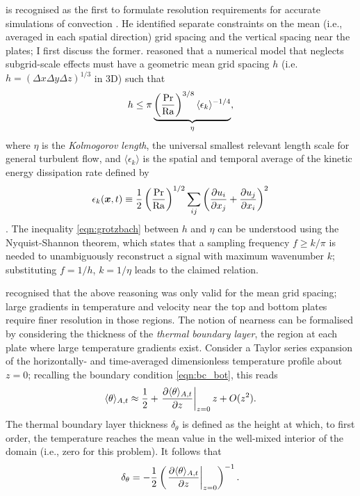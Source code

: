 \documentclass[../main.tex]{subfiles}
\begin{document}
\textcite{grotzbach1983} is recognised as the first to formulate resolution
requirements for accurate simulations of \rb{} convection
\parencite{chilla2012,scheel2013}. He identified separate constraints on the
mean (i.e., averaged in each spatial direction) grid spacing and the vertical
spacing near the plates; I first discuss the former. \citeauthor{grotzbach1983}
reasoned that a numerical model that neglects subgrid-scale effects must have a
geometric mean grid spacing $h$ (i.e. $h = (\Delta x \Delta y \Delta z)^{1/3}$
in 3D) such that
\begin{equation}
    \label{eqn:grotzbach}
    h \leq \pi \underbrace{
        \left( \frac{\mathrm{Pr}}{\mathrm{Ra}} \right)^{3/8}
        \langle \epsilon_k \rangle^{-1/4}
    }_{\eta},
\end{equation}
where $\eta$ is the \emph{Kolmogorov length}, the universal smallest relevant
length scale for general turbulent flow, and $\langle \epsilon_k \rangle$ is
the spatial and temporal average of the kinetic energy dissipation rate defined
by
\begin{equation}
    \label{eqn:kinetic_dissipation}
    \epsilon_k(\bm{x}, t) \equiv
        \frac{1}{2} \left( \frac{\mathrm{Pr}}{\mathrm{Ra}} \right)^{1/2}
        \sum_{ij} \left( \frac{\partial u_i}{\partial x_j} + \frac{\partial u_j}{\partial x_i} \right)^2
\end{equation}
\parencite{chilla2012}. The inequality \cref{eqn:grotzbach} between $h$ and
$\eta$ can be understood using the Nyquist-Shannon theorem, which states that a
sampling frequency $f \geq k/\pi$ is needed to unambiguously reconstruct a
signal with maximum wavenumber $k$; substituting $f = 1/h$, $k = 1/\eta$ leads
to the claimed relation.

\citeauthor{grotzbach1983} recognised that the above reasoning was only valid
for the mean grid spacing; large gradients in temperature and velocity near the
top and bottom plates require finer resolution in those regions. The notion of
nearness can be formalised by considering the thickness of the \emph{thermal
boundary layer}, the region at each plate where large temperature gradients
exist. Consider a Taylor series expansion of the horizontally- and
time-averaged dimensionless temperature profile about $z=0$; recalling the
boundary condition \cref{eqn:bc_bot}, this reads
\[
    \langle \theta \rangle _{A,t} \approx \frac{1}{2}
        + \left. \frac{\partial \langle \theta \rangle _{A,t}}{\partial z} \right|_{z=0} z
        + O(z^2).
\]
The thermal boundary layer thickness $\delta_\theta$ is defined \parencite[see,
e.g.,][]{chilla2012} as the height at which, to first order, the temperature
reaches the mean value in the well-mixed interior of the domain (i.e., zero for
this problem). It follows that
\begin{equation}
    \label{eqn:thermal_bl}
    \delta_\theta = -\frac{1}{2} \left(
        \left. \frac{\partial \langle \theta \rangle _{A,t}}{\partial z} \right|_{z=0}
    \right)^{-1}.
\end{equation}
\end{document}
